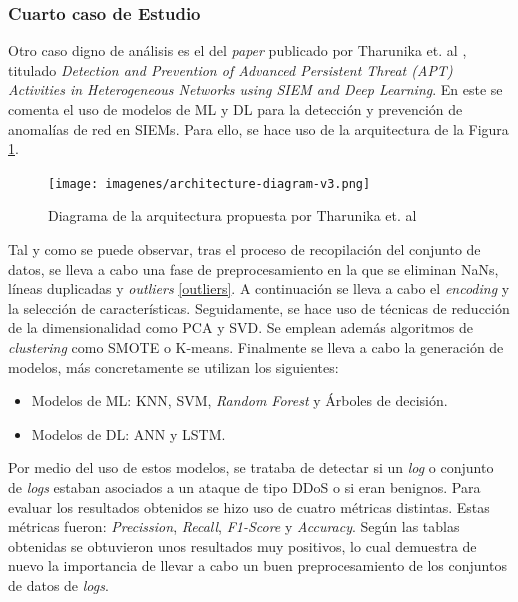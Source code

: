\subsubsection*{Cuarto caso de Estudio}
Otro caso digno de análisis es el del \textit{paper} publicado por Tharunika et. al \cite{10306968}, titulado \textit{Detection and Prevention of Advanced Persistent Threat (APT) Activities in Heterogeneous Networks using \gls{SIEM} and Deep Learning}. En este se comenta el uso de modelos de \gls{ML} y \gls{DL} para la detección y prevención de anomalías de red en \gls{SIEM}s. Para ello, se hace uso de la arquitectura de la Figura \ref{fig:architecture-diagram}.

\begin{figure}[H]
    \centering
    \texttt{[image: imagenes/architecture-diagram-v3.png]}
    \caption{Diagrama de la arquitectura propuesta por Tharunika et. al \cite{10306968}}
    \label{fig:architecture-diagram}
\end{figure}

Tal y como se puede observar, tras el proceso de recopilación del conjunto de datos, se lleva a cabo una fase de preprocesamiento en la que se eliminan \gls{NaN}s, líneas duplicadas y \textit{outliers} \ref{outliers}. A continuación se lleva a cabo el \textit{encoding} y la selección de características. Seguidamente, se hace uso de técnicas de reducción de la dimensionalidad como \gls{PCA} y \gls{SVD}. Se emplean además algoritmos de \textit{clustering} como \gls{SMOTE} o K-means. Finalmente se lleva a cabo la generación de modelos, más concretamente se utilizan los siguientes:

\begin{itemize}
    \item Modelos de \gls{ML}: \gls{KNN}, \gls{SVM}, \textit{Random Forest} y Árboles de decisión.
    \item Modelos de \gls{DL}: \gls{ANN} y \gls{LSTM}.
\end{itemize}

Por medio del uso de estos modelos, se trataba de detectar si un \textit{log} o conjunto de \textit{logs} estaban asociados a un ataque de tipo \gls{DDoS} o si eran benignos. Para evaluar los resultados obtenidos se hizo uso de cuatro métricas distintas. Estas métricas fueron: \textit{Precission}, \textit{Recall}, \textit{F1-Score} y \textit{Accuracy}. Según las tablas obtenidas se obtuvieron unos resultados muy positivos, lo cual demuestra de nuevo la importancia de llevar a cabo un buen preprocesamiento de los conjuntos de datos de \textit{logs}.

